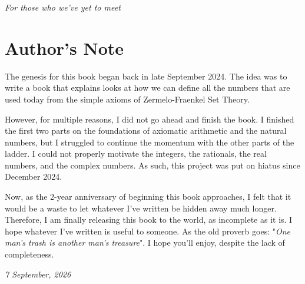\vspace*{2\baselineskip}
\cleardoublepage

\thispagestyle{empty}
\vspace*{1cm}

\begin{center}
    {\fontsize{18pt}{0}\selectfont \textit{For those who we've yet to meet}}\\
\end{center}

\cleardoublepage

\createtoc

\chapter{Author's Note}
The genesis for this book began back in late September 2024. The idea was to write a book that explains looks at how we can define all the numbers that are used today from the simple axioms of Zermelo-Fraenkel Set Theory.

However, for multiple reasons, I did not go ahead and finish the book. I finished the first two parts on the foundations of axiomatic arithmetic and the natural numbers, but I struggled to continue the momentum with the other parts of the ladder. I could not properly motivate the integers, the rationals, the real numbers, and the complex numbers. As such, this project was put on hiatus since December 2024.

Now, as the 2-year anniversary of beginning this book approaches, I felt that it would be a waste to let whatever I've written be hidden away much longer. Therefore, I am finally releasing this book to the world, as incomplete as it is. I hope whatever I've written is useful to someone. As the old proverb goes: "\textit{One man's trash is another man's treasure}". I hope you'll enjoy, despite the lack of completeness.

\hfill{\textit{7 September, 2026}}
